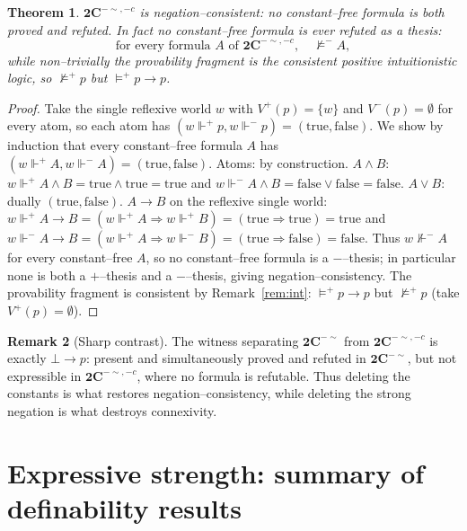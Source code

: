 \documentclass{amsart}
\theoremstyle{plain}
\newtheorem{theorem}{Theorem}
\theoremstyle{definition}
\newtheorem{remark}[theorem]{Remark}
\newcommand{\To}{\rightarrow}
\newcommand{\Ci}{\mathbf{2C}^{-{\sim}}}        %
\newcommand{\Cii}{\mathbf{2C}^{-{\sim},-c}}    %
\newcommand{\fp}{\Vdash^{+}}
\newcommand{\fm}{\Vdash^{-}}
\begin{document}
\begin{theorem}\label{thm:Cii-cons}
$\Cii$ is \emph{negation--consistent}: no constant--free formula is both proved
and refuted. In fact no constant--free formula is ever refuted as a thesis:
\[
\text{for every formula }A\text{ of }\Cii,\quad \not\models^{-}A,
\]
while non--trivially the provability fragment is the consistent positive
intuitionistic logic, so $\not\models^{+}p$ but $\models^{+}p\To p$.
\end{theorem}
\begin{proof}
Take the single reflexive world $w$ with $V^{+}(p)=\{w\}$ and $V^{-}(p)=\emptyset$
for every atom, so each atom has $(w\fp p,w\fm p)=(\text{true},\text{false})$. We
show by induction that every constant--free formula $A$ has
$(w\fp A,w\fm A)=(\text{true},\text{false})$. Atoms: by construction.
$A\wedge B$: $w\fp A\wedge B=\text{true}\wedge\text{true}=\text{true}$ and
$w\fm A\wedge B=\text{false}\vee\text{false}=\text{false}$.
$A\vee B$: dually $(\text{true},\text{false})$.
$A\To B$ on the reflexive single world: $w\fp A\To B=(w\fp A\Rightarrow w\fp
B)=(\text{true}\Rightarrow\text{true})=\text{true}$ and $w\fm A\To B=(w\fp
A\Rightarrow w\fm B)=(\text{true}\Rightarrow\text{false})=\text{false}$. Thus
$w\not\fm A$ for every constant--free $A$, so no constant--free formula is a
$-$--thesis; in particular none is both a $+$--thesis and a $-$--thesis, giving
negation--consistency. The provability fragment is consistent by
Remark~\ref{rem:int}: $\models^{+}p\To p$ but $\not\models^{+}p$ (take
$V^{+}(p)=\emptyset$).
\end{proof}

\begin{remark}[Sharp contrast]
The witness separating $\Ci$ from $\Cii$ is exactly $\bot\To p$: present and
simultaneously proved and refuted in $\Ci$, but not expressible in $\Cii$, where
no formula is refutable. Thus deleting the constants is what restores
negation--consistency, while deleting the strong negation is what destroys
connexivity.
\end{remark}

\section{Expressive strength: summary of definability results}\label{sec:expr}
\end{document}
